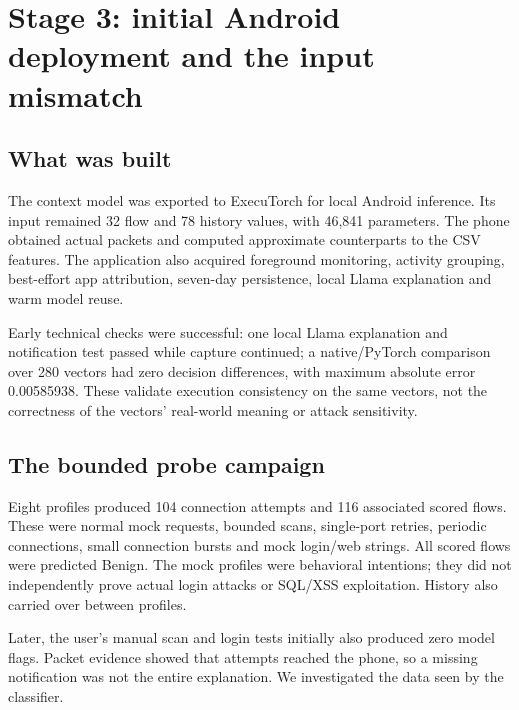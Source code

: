 \documentclass[11pt,a4paper,oneside]{report}
\begin{document}
\chapter{Stage 3: initial Android deployment and the input mismatch}
\section{What was built}
The context model was exported to ExecuTorch for local Android inference. Its input remained 32 flow and 78 history values, with 46,841 parameters. The phone obtained actual packets and computed approximate counterparts to the CSV features. The application also acquired foreground monitoring, activity grouping, best-effort app attribution, seven-day persistence, local Llama explanation and warm model reuse.

Early technical checks were successful: one local Llama explanation and notification test passed while capture continued; a native/PyTorch comparison over 280 vectors had zero decision differences, with maximum absolute error 0.00585938. These validate execution consistency on the same vectors, not the correctness of the vectors' real-world meaning or attack sensitivity.

\section{The bounded probe campaign}
Eight profiles produced 104 connection attempts and 116 associated scored flows. These were normal mock requests, bounded scans, single-port retries, periodic connections, small connection bursts and mock login/web strings. All scored flows were predicted Benign. The mock profiles were behavioral intentions; they did not independently prove actual login attacks or SQL/XSS exploitation. History also carried over between profiles.

Later, the user's manual scan and login tests initially also produced zero model flags. Packet evidence showed that attempts reached the phone, so a missing notification was not the entire explanation. We investigated the data seen by the classifier.
\end{document}

